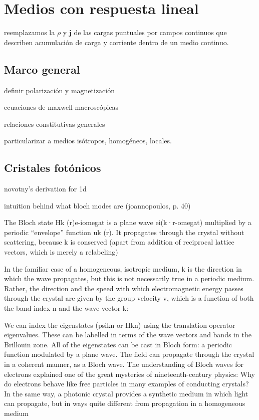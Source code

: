 \newpage
\section{Medios con respuesta lineal}
\label{sec.2-medioslineales}

reemplazamos la \(\rho\) y \(\mathbf{j}\) de las cargas puntuales por campos continuos que describen acumulación de carga y corriente dentro de un medio continuo.

\subsection{Marco general}
\label{subsec.2-general}

definir polarización y magnetización

ecuaciones de maxwell macroscópicas

relaciones constitutivas generales

particularizar a medios isótropos, homogéneos, locales.


\subsection{Cristales fotónicos}
\label{subsec.2-cristales}

novotny's derivation for 1d

intuition behind what bloch modes are (joannopoulos, p. 40)

The Bloch state Hk (r)e-iomegat
is a plane wave ei(k·r-omegat) multiplied by a periodic “envelope” function uk (r). It
propagates through the crystal without scattering, because k is conserved (apart
from addition of reciprocal lattice vectors, which is merely a relabeling)

In the familiar case of a homogeneous, isotropic medium, k is the direction in
which the wave propagates, but this is not necessarily true in a periodic medium.
Rather, the direction and the speed with which electromagnetic energy passes
through the crystal are given by the group velocity v, which is a function of both
the band index n and the wave vector k:


We can index the eigenstates (psikn or Hkn) using the translation operator
eigenvalues. These can be labelled in terms of the wave vectors and bands in
the Brillouin zone. All of the eigenstates can be cast in Bloch form: a periodic
function modulated by a plane wave. The field can propagate through the crystal
in a coherent manner, as a Bloch wave. The understanding of Bloch waves for
electrons explained one of the great mysteries of nineteenth-century physics: Why
do electrons behave like free particles in many examples of conducting crystals?
In the same way, a photonic crystal provides a synthetic medium in which light
can propagate, but in ways quite different from propagation in a homogeneous
medium

